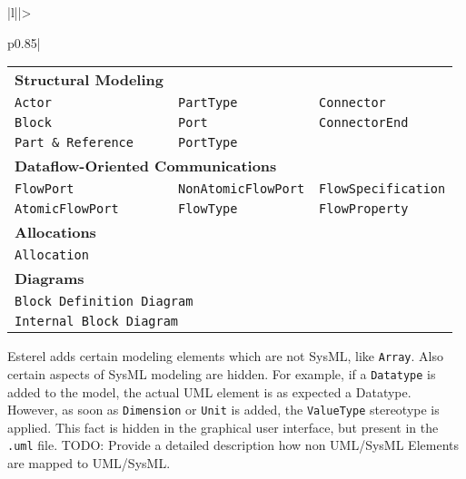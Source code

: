 \documentclass{template/openetcs_article}
\begin{document}
\begin{longtable}{|l||>{\raggedright}p{0.85\linewidth}|}
\begin{tabular}{l l l}
                            \textbf{Structural Modeling}                                                          \\
                            \texttt{Actor}              & \texttt{PartType}          & \texttt{Connector}         \\
                            \texttt{Block}              & \texttt{Port}              & \texttt{ConnectorEnd}      \\
                            \texttt{Part \& Reference}  & \texttt{PortType}                                       \\
                            \multicolumn{3}{l}{\textbf{Dataflow-Oriented Communications}}                         \\
                            \texttt{FlowPort}           & \texttt{NonAtomicFlowPort} & \texttt{FlowSpecification} \\
                            \texttt{AtomicFlowPort}     & \texttt{FlowType}          & \texttt{FlowProperty}      \\
                            \textbf{Allocations}                                                                  \\
                            \texttt{Allocation}                                                                   \\
                            \textbf{Diagrams}                                                                     \\
                            \multicolumn{3}{l}{\texttt{Block Definition Diagram}}                                 \\
                            \multicolumn{3}{l}{\texttt{Internal Block Diagram}}                                   \\
                          \end{tabular} 
                          \vspace

                          Esterel adds certain modeling elements which are not SysML, like \texttt{Array}. Also certain aspects
                          of SysML modeling are hidden. For example, if a \texttt{Datatype} is added to the model, the actual 
                          UML element is as expected a Datatype. However, as soon as \texttt{Dimension} or \texttt{Unit} 
                          is added, the \texttt{ValueType} stereotype is applied. This fact is hidden in the graphical user
                          interface, but present in the \texttt{.uml} file.
                          TODO: Provide a detailed description how non UML/SysML Elements are mapped to UML/SysML.
                          \tabularnewline \hline
\end{longtable}
\end{document}

